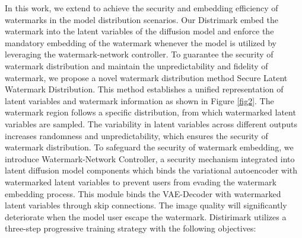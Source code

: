 In this work, we extend to achieve the security and embedding efficiency of watermarks in the model distribution scenarios. Our Distrimark embed the watermark into the latent variables of the diffusion model and enforce the mandatory embedding of the watermark whenever the model is utilized by leveraging the watermark-network controller.
To guarantee the security of watermark distribution and maintain the unpredictability and fidelity of watermark, we propose a novel watermark distribution method Secure Latent Watermark Distribution. This method establishes a unified representation of latent variables and watermark information as shown in Figure \ref{fig2}. The watermark region follows a specific distribution, from which watermarked latent variables are sampled. The variability in latent variables across different outputs increases randomness and unpredictability, which ensures the security of watermark distribution. To safeguard the security of watermark embedding, we introduce Watermark-Network Controller, a security mechanism integrated into latent diffusion model components which binds the variational autoencoder with watermarked latent variables to prevent users from evading the watermark embedding process. This module binds the VAE-Decoder with watermarked latent variables through skip connections. The image quality will significantly deteriorate when the model user escape the watermark. Distirimark utilizes a three-step progressive training strategy with the following objectives:

